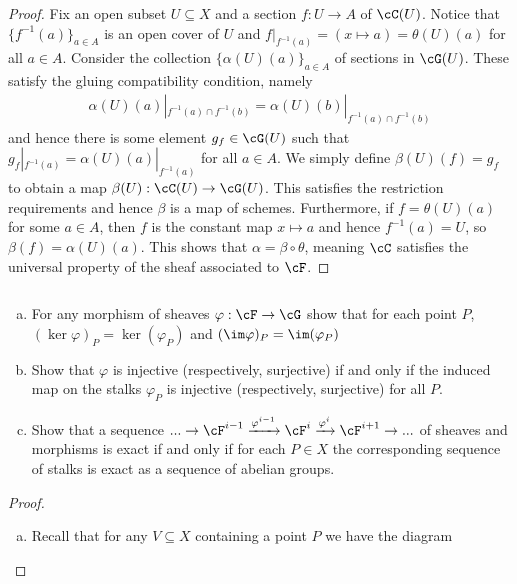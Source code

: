 \begin{problemset}
\begin{proof}
		Fix an open subset $U \subseteq X$ and a section $f:U\to A$ of $\cC(U)$. Notice that $\{f^{-1}(a)\}_{a\in A}$ is an open cover of $U$ and $f|_{f^{-1}(a)} = (x\mapsto a) = \theta(U)(a)$ for all $a \in A$. Consider the collection $\{\alpha(U)(a)\}_{a\in A}$ of sections in $\cG(U)$. These satisfy the gluing compatibility condition, namely
		\begin{align*}
			\alpha(U)(a)|_{f^{-1}(a)\cap f^{-1}(b)} = \alpha(U)(b)|_{f^{-1}(a)\cap f^{-1}(b)}
		\end{align*}
		and hence there is some element $g_f \in \cG(U)$ such that $g_f|_{f^{-1}(a)} = \alpha(U)(a)|_{f^{-1}(a)}$ for all $a \in A$. We simply define $\beta(U)(f) = g_f$ to obtain a map $\beta(U):\cC(U)\to \cG(U)$. This satisfies the restriction requirements and hence $\beta$ is a map of schemes. Furthermore, if $f = \theta(U)(a)$ for some $a \in A$, then $f$ is the constant map $x \mapsto a$ and hence $f^{-1}(a) = U$, so $\beta(f) = \alpha(U)(a)$. This shows that $\alpha = \beta\circ \theta$, meaning $\cC$ satisfies the universal property of the sheaf associated to $\cF$.
	\end{proof}
	\item $ $
	\begin{enumerate}[(a)]
		\item For any morphism of sheaves $\varphi:\cF\to \cG$ show that for each point $P$, $(\ker\varphi)_P = \ker(\varphi_P)$ and $(\im\varphi)_P = \im(\varphi_P)$
		\item Show that $\varphi$ is injective (respectively, surjective) if and only if the induced map on the stalks $\varphi_P$ is injective (respectively, surjective) for all $P$.
		\item Show that a sequence $...\to \cF^{i-1}\xrightarrow{\varphi^{i-1}} \cF^i \xrightarrow{\varphi^i}\cF^{i+1}\to ...$ of sheaves and morphisms is exact if and only if for each $P\in X$ the corresponding sequence of stalks is exact as a sequence of abelian groups.
	\end{enumerate}
	\begin{proof}$ $
		\begin{enumerate}[(a)]
			\item Recall that for any $V\subseteq X$ containing a point $P$ we have the diagram
				\begin{center}

\end{center}
\end{enumerate}
\end{proof}
\end{problemset}
